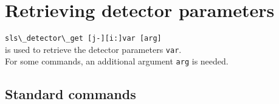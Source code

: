 \documentclass{article}
\begin{document}
 

\section{Retrieving detector parameters}


\verb=sls\_detector\_get [j-][i:]var [arg]=\\

is used to retrieve the detector parameters \verb=var=.\\
For some commands, an additional argument \verb=arg= is needed.



\subsection{Standard commands}
\end{document}
